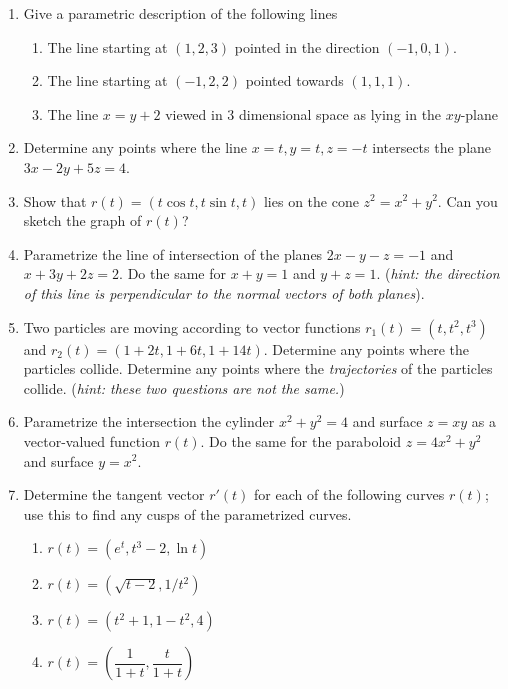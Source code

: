 \documentclass[12pt]{article}
\numberwithin{equation}{subsection}
\numberwithin{figure}{subsection}
\theoremstyle{note}
\begin{document}
{\begin{enumerate}[label=\arabic*.]
\item Give a parametric description of the following lines

\begin{enumerate}
	\item The line starting at $(1,2,3)$ pointed in the direction $(-1,0,1)$.
	\item The line starting at $(-1,2,2)$ pointed towards $(1,1,1)$. 
	\item The line $x=y+2$ viewed in 3 dimensional space as lying in the $xy$-plane
\end{enumerate}



\item Determine any points where the line $x=t,y=t,z=-t$ intersects the plane $3x-2y+5z=4$.

\item Show that $r(t)=(t\cos t, t\sin t, t)$ lies on the cone $z^2=x^2+y^2$. Can you sketch the graph of $r(t)$?

\item Parametrize the line of intersection of the planes $2x-y-z=-1$ and $x+3y+2z=2$. Do the same for $x+y=1$ and $y+z=1$. (\textit{hint: the direction of this line is perpendicular to the normal vectors of both planes}).


\item Two particles are moving according to vector functions $r_1(t)=(t,t^2,t^3)$ and $r_2(t)=(1+2t, 1+6t, 1+14t)$. Determine any points where the particles collide. Determine any points where the \textit{trajectories} of the particles collide. (\textit{hint: these two questions are not the same.}) 

\item Parametrize the intersection the cylinder $x^2+y^2=4$ and surface $z=xy$ as a vector-valued function $r(t)$. Do the same for  the paraboloid $z=4x^2+y^2$ and surface $y=x^2$.


\item Determine the tangent vector $r'(t)$ for each of the following curves $r(t)$; use this to find any cusps of the parametrized curves. 

\begin{enumerate}
	\item $r(t)=(e^t, t^3-2, \ln t)$
	\item $r(t)=(\sqrt{t-2}, 1/t^2)$
	\item $r(t)=(t^2+1, 1-t^2, 4)$
	\item $r(t)=\left(\dfrac{1}{1+t}, \dfrac{t}{1+t}\right)$
\end{enumerate}


\end{enumerate}}
\end{document}
